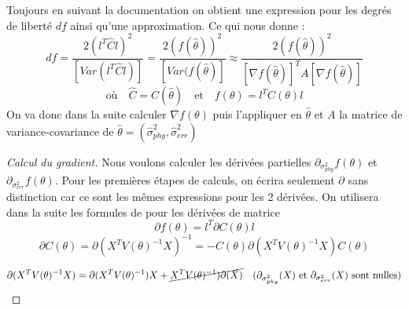 \documentclass[a4paper, 12pt]{article}\usepackage[]{graphicx}\usepackage[]{xcolor}
\begin{document}
Toujours en suivant la documentation \cite{kuznetsovaLmerTestPackageTests2017} on obtient une expression pour les degrés de liberté $df$ ainsi qu'une approximation. Ce qui nous donne :
\begin{equation}
    df = \frac{2(l^T\hat{C}l)^2}{[Var(l^T\hat{C}l)]}=\frac{2(f(\hat{\theta}))^2}{[Var(f(\hat{\theta})]}\approx \frac{2(f(\hat{\theta}))^2}{[\nabla f(\hat{\theta})]^T A[\nabla f(\hat{\theta})]}
\end{equation} 
\[\text{où} \quad \hat{C} = C(\hat\theta) \quad \text{et} \quad f(\theta) = l^TC(\theta)l\]
On va donc dans la suite calculer $\nabla f(\theta)$ puis l'appliquer en $\hat{\theta}$ et $A$ la matrice de variance-covariance de $\hat{\theta}=(\hat{\sigma}^2_{phy}, \hat{\sigma}^2_{err})$ 

\begin{proof}[Calcul du gradient]
Nous voulons calculer les dérivées partielles $\partial_{\sigma^2_{phy}}f(\theta)$ et $\partial_{\sigma^2_{err}}f(\theta)$. Pour les premières étapes de calculs, on écrira seulement $\partial$ sans distinction car ce sont les mêmes expressions pour les 2 dérivées. 
On utilisera dans la suite les formules de \cite{petersenMatrixCookbook2012} pour les dérivées de matrice
\[
\partial f(\theta)=l^T\partial C(\theta)l
\]
\[
\partial C(\theta)=\partial (X^TV(\theta)^{-1}X)^{-1} = -C(\theta) \partial (X^TV(\theta)^{-1}X)C(\theta)
\]

\[
    \partial (X^TV(\theta)^{-1}X) = \partial (X^TV(\theta)^{-1})X + \cancel{X^TV(\theta)^{-1})\partial(X)} \quad (\partial_{\sigma^2_{phy}}(X)\text{ et } \partial_{\sigma^2_{err}}(X) \text{ sont nulles})
\]



\end{proof}
\end{document}
